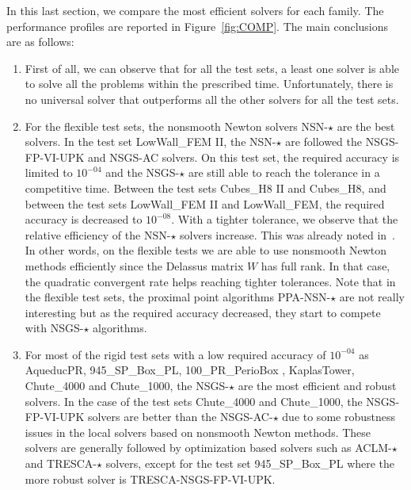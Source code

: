 In this last section, we compare the most efficient solvers for each family. The performance profiles are reported in Figure~\ref{fig:COMP}. The main conclusions are as follows:
\begin{enumerate}
\item First of all, we can observe that for all the test sets, a least one solver is able to solve all the problems within the prescribed time.  Unfortunately, there is no universal solver that outperforms all the other solvers for all the test sets.
\item For the flexible test sets, the nonsmooth Newton solvers {\sf NSN-$\star$} are the best solvers. In the test set LowWall\_FEM II, the {\sf NSN-$\star$} are followed the {\sf NSGS-FP-VI-UPK} and {\sf NSGS-AC} solvers. On this test set, the required accuracy is limited to $10^{-04}$ and the  {\sf NSGS-$\star$} are still able to reach the tolerance in a competitive time. Between the test sets {Cubes\_H8 II} and {Cubes\_H8}, and between the test sets  LowWall\_FEM II and LowWall\_FEM, the required accuracy is decreased to $10^{-08}$. With a tighter tolerance, we observe that the relative efficiency of the {\sf NSN-$\star$} solvers increase. This was already noted in~\citep{Acary.ea_CSMA2017}. In other words, on the flexible tests we are able to use nonsmooth Newton methods efficiently since the Delassus matrix $W$ has full rank. In that case, the quadratic convergent rate helps reaching tighter tolerances. Note that in the flexible test sets, the proximal point algorithms {\sf PPA-NSN-$\star$} are not really interesting but as the required accuracy decreased, they start to compete with {\sf NSGS-$\star$} algorithms.

\item For most of the rigid test sets with a low required accuracy of $10^{-04}$ as AqueducPR, 945\_SP\_Box\_PL, 100\_PR\_PerioBox , KaplasTower, Chute\_4000 and Chute\_1000,   the {\sf NSGS-$\star$} are the most efficient and robust solvers. In the case of the test sets Chute\_4000 and Chute\_1000,  the {\sf NSGS-FP-VI-UPK} solvers are better than the {\sf NSGS-AC-$\star$} due to some robustness issues in the local solvers based on nonsmooth Newton methods. These solvers are generally followed by optimization based solvers such as {\sf ACLM-$\star$} and {\sf TRESCA-$\star$} solvers, except for the test set 945\_SP\_Box\_PL where the more robust solver is {\sf TRESCA-NSGS-FP-VI-UPK}.
  

\end{enumerate}
